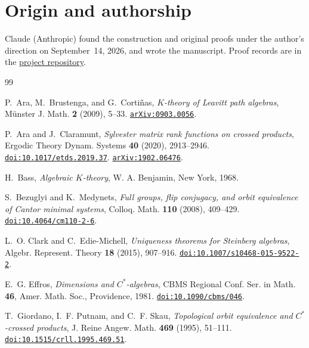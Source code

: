 \documentclass[11pt]{amsart}
\theoremstyle{remark}
\newcommand{\doi}[1]{\href{https://doi.org/#1}{\nolinkurl{doi:#1}}}
\newcommand{\arxiv}[1]{\href{https://arxiv.org/abs/#1}{\nolinkurl{arXiv:#1}}}
\begin{document}
\section*{Origin and authorship}
Claude (Anthropic) found the construction and original proofs under the
author's direction on September~14, 2026, and wrote the manuscript. Proof
records are in the
\href{https://github.com/SauersML/group-approximation}{project repository}.

\begin{thebibliography}{99}


P.~Ara, M.~Brustenga, and G.~Corti\~nas, \emph{$K$-theory of Leavitt path
algebras}, M\"unster J. Math. \textbf{2} (2009), 5--33. \arxiv{0903.0056}.

P.~Ara and J.~Claramunt, \emph{Sylvester matrix rank functions on crossed
products}, Ergodic Theory Dynam. Systems \textbf{40} (2020), 2913--2946.
\doi{10.1017/etds.2019.37}. \arxiv{1902.06476}.

H.~Bass, \emph{Algebraic $K$-theory}, W. A. Benjamin, New York, 1968.

S.~Bezuglyi and K.~Medynets,
\emph{Full groups, flip conjugacy, and orbit equivalence of Cantor minimal
systems}, Colloq. Math. \textbf{110} (2008), 409--429.
\doi{10.4064/cm110-2-6}.

L.~O. Clark and C.~Edie-Michell, \emph{Uniqueness theorems for Steinberg
algebras}, Algebr. Represent. Theory \textbf{18} (2015), 907--916.
\doi{10.1007/s10468-015-9522-2}.

E.~G. Effros, \emph{Dimensions and $C^*$-algebras}, CBMS Regional Conf.
Ser. in Math. \textbf{46}, Amer. Math. Soc., Providence, 1981.
\doi{10.1090/cbms/046}.

T.~Giordano, I.~F. Putnam, and C.~F. Skau,
\emph{Topological orbit equivalence and $C^*$-crossed products},
J. Reine Angew. Math. \textbf{469} (1995), 51--111.
\doi{10.1515/crll.1995.469.51}.


\end{thebibliography}
\end{document}
